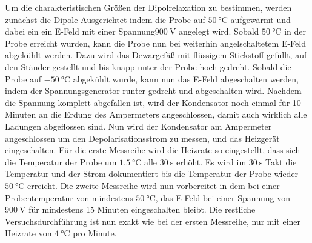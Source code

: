     Um die charakteristischen Größen der Dipolrelaxation zu bestimmen, 
    werden zunächst die Dipole Ausgerichtet indem die Probe auf $\SI{50}{\celsius}$ aufgewärmt und dabei ein ein E-Feld mit einer Spannung$\SI{900}{\volt}$ angelegt wird.
    Sobald $\SI{50}{\celsius}$ in der Probe erreicht wurden, kann die Probe nun bei weiterhin angelschaltetem E-Feld abgekühlt werden.
    Dazu wird das Dewargefäß mit flüssigem Stickstoff gefüllt, auf den Ständer gestellt und bis knapp unter der Probe hoch gedreht.
    Sobald die Probe auf $\SI{-50}{\celsius}$ abgekühlt wurde, kann nun das E-Feld abgeschalten werden, indem der Spannungsgenerator runter gedreht und abgeschalten wird.
    Nachdem die Spannung komplett abgefallen ist, wird der Kondensator noch einmal für 10 Minuten an die Erdung des Ampermeters angeschlossen, damit auch wirklich alle Ladungen abgeflossen sind.
    Nun wird der Kondensator am Ampermeter angeschlossen um den Depolarisationsstrom zu messen, und das Heizgerät eingeschalten.
    Für die erste Messreihe wird die Heizrate so eingestellt, dass sich die Temperatur der Probe um $\SI{1.5}{\celsius}$ alle $\SI{30}{\second}$ erhöht.
    Es wird im $\SI{30}{\second}$ Takt die Temperatur und der Strom dokumentiert bis die Temperatur der Probe wieder $\SI{50}{\celsius}$ erreicht. 
    Die zweite Messreihe wird nun vorbereitet in dem bei einer Probentemperatur von mindestens $\SI{50}{\celsius}$, das E-Feld bei einer Spannung von $\SI{900}{\volt}$ für mindestens 15 Minuten eingeschalten bleibt.
    Die restliche Versuchsdurchführung ist nun exakt wie bei der ersten Messreihe, nur mit einer Heizrate von $\SI{4}{\celsius}$ pro Minute.